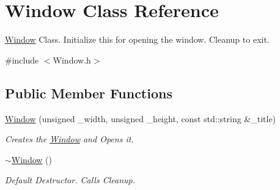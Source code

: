 \hypertarget{class_window}{}\section{Window Class Reference}
\label{class_window}


\mbox{\hyperlink{class_window}{Window}} Class. Initialize this for opening the window. Cleanup to exit.  




{\ttfamily \#include $<$Window.\+h$>$}

\subsection*{Public Member Functions}
\begin{DoxyCompactItemize}
\item 
\mbox{\hyperlink{class_window_a65335a745eaadd9dbdbd265b7fbf0fc5}{Window}} (unsigned \+\_\+width, unsigned \+\_\+height, const std\+::string \&\+\_\+title)
\begin{DoxyCompactList}\small\item\em Creates the \mbox{\hyperlink{class_window}{Window}} and Opens it. \end{DoxyCompactList}\item 
\mbox{\hyperlink{class_window_a245d821e6016fa1f6970ccbbedd635f6}{$\sim$\+Window}} ()
\begin{DoxyCompactList}\small\item\em Default Destructor. Calls Cleanup. \end{DoxyCompactList}\end{DoxyCompactItemize}
